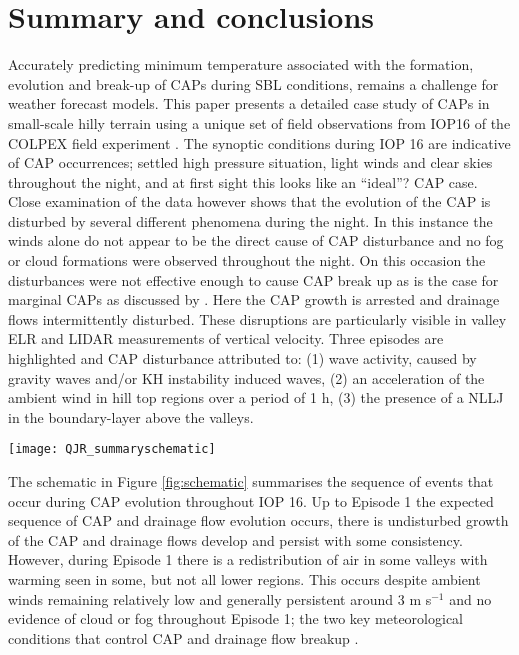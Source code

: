 \documentclass[times]{qjrms4}
\begin{document}
\section{Summary and conclusions}
\label{summary}
Accurately predicting minimum temperature associated with the formation, evolution and break-up of CAPs during SBL conditions, remains a challenge for weather forecast models. This paper presents a detailed case study of CAPs in small-scale hilly terrain using a unique set of field observations from IOP16 of the COLPEX field experiment \citep{price2010COLPEX}. The synoptic conditions during IOP 16 are indicative of CAP occurrences; settled high pressure situation, light winds and clear skies throughout the night, and at first sight this looks like an ``ideal''? CAP case. Close examination of the data however shows that the evolution of the CAP is disturbed by several different phenomena during the night. In this instance the winds alone do not appear to be the direct cause of CAP disturbance and no fog or cloud formations were observed throughout the night. On this occasion the disturbances were not effective enough to cause CAP break up as is the case for marginal CAPs as discussed by \citep{mahrt2015common}. Here the CAP growth is arrested and drainage flows intermittently disturbed. These disruptions are particularly visible in valley ELR and LIDAR measurements of vertical velocity. Three episodes are highlighted and CAP disturbance attributed to: (1) wave activity, caused by gravity waves and/or KH instability induced waves, (2) an acceleration of the ambient wind in hill top regions over a period of 1 h, (3) the presence of a NLLJ in the boundary-layer above the valleys.
       \begin{figure*}
        \centering
        \texttt{[image: QJR\_summaryschematic]}
        \caption{\textcolor{red}{\bf Figure needs replacing with higher def version on Stevies laptop. Either improve this figure or change to illustrate each phenomena separately} Illustration showing the sequence of events that cause CAP disruption during IOP 16.}
        \label{fig:schematic}
        \end{figure*}

The schematic in Figure \ref{fig:schematic} summarises the sequence of events that occur during CAP evolution throughout IOP 16. Up to Episode 1 the expected sequence of CAP and drainage flow evolution occurs, there is undisturbed growth of the CAP and drainage flows develop and persist with some consistency. However, during Episode 1 there is a redistribution of air in some valleys with warming seen in some, but not all lower regions. This occurs despite ambient winds remaining relatively low and generally persistent around 3 m s$^{-1}$ and no evidence of cloud or fog throughout Episode 1; the two key meteorological conditions that control CAP and drainage flow breakup \citep{sheridan2013characteristics}. 
\end{document}
